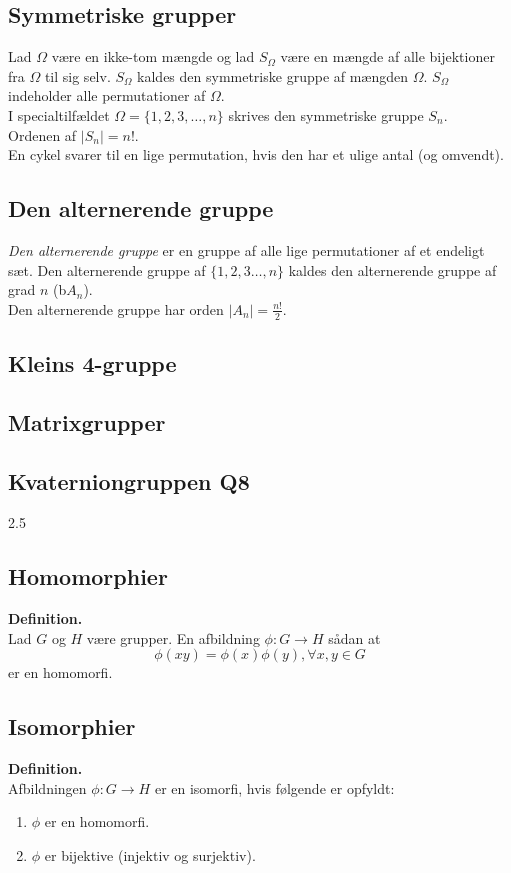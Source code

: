 \documentclass[11pt]{article}
\begin{document}
\subsection*{Symmetriske grupper}
Lad $\Omega$ være en ikke-tom mængde og lad $S_{\Omega}$ være en mængde af alle bijektioner fra $\Omega$ til sig selv. $S_{\Omega}$ kaldes den symmetriske gruppe af mængden $\Omega$. $S_{\Omega}$ indeholder alle permutationer af $\Omega$.\\
I specialtilfældet $\Omega = \{ 1,2,3, \hdots, n \}$ skrives den symmetriske gruppe $S_n$.\\
Ordenen af $|S_n| = n!$.\\
En cykel svarer til en lige permutation, hvis den har et ulige antal (og omvendt).

\subsection*{Den alternerende gruppe}
\textit{Den alternerende gruppe} er en gruppe af alle lige permutationer af et endeligt sæt. Den alternerende gruppe af $\{ 1,2,3 \hdots, n \}$ kaldes den alternerende gruppe af grad $n$ (b$A_n$).\\
Den alternerende gruppe har orden $|A_n| = \frac{n!}{2}$.
\subsection*{Kleins 4-gruppe}
\subsection*{Matrixgrupper}
\subsection*{Kvaterniongruppen Q8}
2.5
\subsection*{Homomorphier}
\textbf{Definition.}\\
Lad $G$ og $H$ være grupper. En afbildning $\phi : G \to H$ sådan at
$$\phi(xy) = \phi(x) \phi(y), \forall{x,y} \in G$$
er en homomorfi.

\subsection*{Isomorphier}
\textbf{Definition.}\\
Afbildningen $\phi : G \to H$ er en isomorfi, hvis følgende er opfyldt:
\begin{enumerate}
  \item $\phi$ er en homomorfi.
  \item $\phi$ er bijektive (injektiv og surjektiv).
\end{enumerate}
\end{document}
